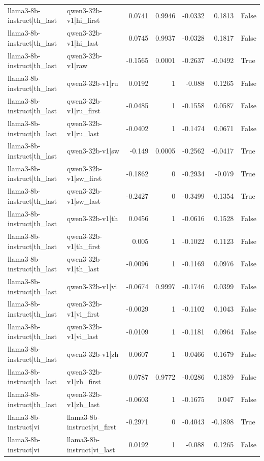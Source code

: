 \begin{table}
\begin{tabular}{l l r r r r l}
llama3-8b-instruct|th_last & qwen3-32b-v1|hi_first & 0.0741 & 0.9946 & -0.0332 & 0.1813 & False \\
llama3-8b-instruct|th_last & qwen3-32b-v1|hi_last & 0.0745 & 0.9937 & -0.0328 & 0.1817 & False \\
llama3-8b-instruct|th_last & qwen3-32b-v1|raw & -0.1565 & 0.0001 & -0.2637 & -0.0492 & True \\
llama3-8b-instruct|th_last & qwen3-32b-v1|ru & 0.0192 & 1 & -0.088 & 0.1265 & False \\
llama3-8b-instruct|th_last & qwen3-32b-v1|ru_first & -0.0485 & 1 & -0.1558 & 0.0587 & False \\
llama3-8b-instruct|th_last & qwen3-32b-v1|ru_last & -0.0402 & 1 & -0.1474 & 0.0671 & False \\
llama3-8b-instruct|th_last & qwen3-32b-v1|sw & -0.149 & 0.0005 & -0.2562 & -0.0417 & True \\
llama3-8b-instruct|th_last & qwen3-32b-v1|sw_first & -0.1862 & 0 & -0.2934 & -0.079 & True \\
llama3-8b-instruct|th_last & qwen3-32b-v1|sw_last & -0.2427 & 0 & -0.3499 & -0.1354 & True \\
llama3-8b-instruct|th_last & qwen3-32b-v1|th & 0.0456 & 1 & -0.0616 & 0.1528 & False \\
llama3-8b-instruct|th_last & qwen3-32b-v1|th_first & 0.005 & 1 & -0.1022 & 0.1123 & False \\
llama3-8b-instruct|th_last & qwen3-32b-v1|th_last & -0.0096 & 1 & -0.1169 & 0.0976 & False \\
llama3-8b-instruct|th_last & qwen3-32b-v1|vi & -0.0674 & 0.9997 & -0.1746 & 0.0399 & False \\
llama3-8b-instruct|th_last & qwen3-32b-v1|vi_first & -0.0029 & 1 & -0.1102 & 0.1043 & False \\
llama3-8b-instruct|th_last & qwen3-32b-v1|vi_last & -0.0109 & 1 & -0.1181 & 0.0964 & False \\
llama3-8b-instruct|th_last & qwen3-32b-v1|zh & 0.0607 & 1 & -0.0466 & 0.1679 & False \\
llama3-8b-instruct|th_last & qwen3-32b-v1|zh_first & 0.0787 & 0.9772 & -0.0286 & 0.1859 & False \\
llama3-8b-instruct|th_last & qwen3-32b-v1|zh_last & -0.0603 & 1 & -0.1675 & 0.047 & False \\
llama3-8b-instruct|vi & llama3-8b-instruct|vi_first & -0.2971 & 0 & -0.4043 & -0.1898 & True \\
llama3-8b-instruct|vi & llama3-8b-instruct|vi_last & 0.0192 & 1 & -0.088 & 0.1265 & False \\

\end{tabular}
\end{table}
